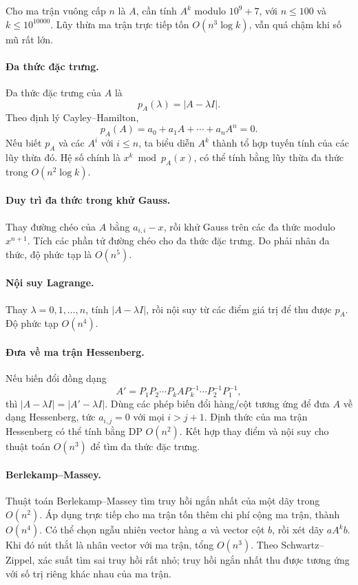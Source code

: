 \documentclass[11pt]{article}
\begin{document}
Cho ma trận vuông cấp \(n\) là \(A\), cần tính \(A^k\) modulo \(10^9+7\), với
\(n\le 100\) và \(k\le 10^{10000}\). Lũy thừa ma trận trực tiếp tốn
\(O(n^3\log k)\), vẫn quá chậm khi số mũ rất lớn.

\paragraph{Đa thức đặc trưng.}
Đa thức đặc trưng của \(A\) là
\[
  p_A(\lambda)=|A-\lambda I|.
\]
Theo định lý Cayley--Hamilton,
\[
  p_A(A)=a_0+a_1A+\cdots+a_nA^n=0.
\]
Nếu biết \(p_A\) và các \(A^i\) với \(i\le n\), ta biểu diễn \(A^k\) thành tổ
hợp tuyến tính của các lũy thừa đó. Hệ số chính là \(x^k\bmod p_A(x)\), có thể
tính bằng lũy thừa đa thức trong \(O(n^2\log k)\).

\paragraph{Duy trì đa thức trong khử Gauss.}
Thay đường chéo của \(A\) bằng \(a_{i,i}-x\), rồi khử Gauss trên các đa thức
modulo \(x^{n+1}\). Tích các phần tử đường chéo cho đa thức đặc trưng. Do phải
nhân đa thức, độ phức tạp là \(O(n^5)\).

\paragraph{Nội suy Lagrange.}
Thay \(\lambda=0,1,\ldots,n\), tính \(|A-\lambda I|\), rồi nội suy từ các điểm
giá trị để thu được \(p_A\). Độ phức tạp \(O(n^4)\).

\paragraph{Đưa về ma trận Hessenberg.}
Nếu biến đổi đồng dạng
\[
  A'=P_1P_2\cdots P_k A P_k^{-1}\cdots P_2^{-1}P_1^{-1},
\]
thì \(|A-\lambda I|=|A'-\lambda I|\). Dùng các phép biến đổi hàng/cột tương ứng
để đưa \(A\) về dạng Hessenberg, tức \(a_{i,j}=0\) với mọi \(i>j+1\). Định thức
của ma trận Hessenberg có thể tính bằng DP \(O(n^2)\). Kết hợp thay điểm và nội
suy cho thuật toán \(O(n^3)\) để tìm đa thức đặc trưng.

\paragraph{Berlekamp--Massey.}
Thuật toán Berlekamp--Massey tìm truy hồi ngắn nhất của một dãy trong \(O(n^2)\).
Áp dụng trực tiếp cho ma trận tốn thêm chi phí cộng ma trận, thành \(O(n^4)\).
Có thể chọn ngẫu nhiên vector hàng \(a\) và vector cột \(b\), rồi xét dãy
\(aA^k b\). Khi đó nút thắt là nhân vector với ma trận, tổng \(O(n^3)\). Theo
Schwartz--Zippel, xác suất tìm sai truy hồi rất nhỏ; truy hồi ngắn nhất thu
được tương ứng với số trị riêng khác nhau của ma trận.
\end{document}
